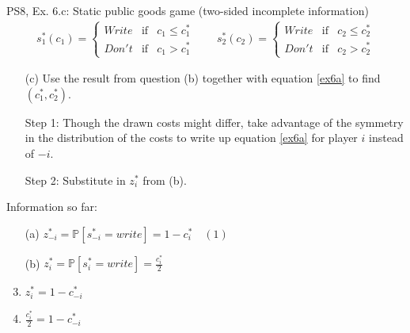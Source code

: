 \begin{frame}{PS8, Ex. 6.c: Static public goods game (two-sided incomplete information)}
    \begin{align*}
      s_1^*(c_1)=\left\{\begin{array}{rcl}
        Write & \text{if} & c_1\leq c_1^*\\
        Don't & \text{if} & c_1>c_1^*
        \end{array}\right.\quad\quad
      s_2^*(c_2)=\left\{\begin{array}{rcl}
        Write & \text{if} & c_2\leq c_2^*\\
        Don't & \text{if} & c_2>c_2^*
        \end{array}\right.
    \end{align*}
    \vspace{-12pt}
    \begin{itemize}
      \item[(c)] Use the result from question (b) together with equation \eqref{ex6a} to find $(c_1^* , c_2^*)$.
    \end{itemize}
    \begin{multicols}{2}
      \begin{itemize}
        \item[Step 1:] Though the drawn costs might differ, take advantage of the symmetry in the distribution of the costs to write up equation \eqref{ex6a} for player $i$ instead of $-i$.
        \item[Step 2:] Substitute in $z_i^*$ from (b).
      \end{itemize}
      \vfill\null\columnbreak
      Information so far:
      \begin{enumerate}
        \item[(a)] $z_{-i}^*=\mathbb{P}[s_{-i}^*=write]=1-c_i^*\quad(1)$
        \item[(b)] $z_i^*=\mathbb{P}[s_i^*=write]=\frac{c_i^*}{2}$
        \item      $z_i^*=1-c_{-i}^*$
        \item      $\frac{c_i^*}{2}=1-c_{-i}^*$
      \end{enumerate}
      \vfill\null
    \end{multicols}
\end{frame}
